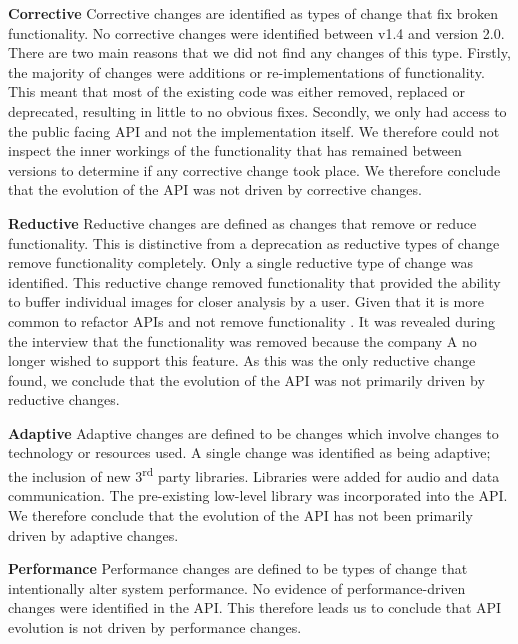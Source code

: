 \documentclass{sig-alternate}
\begin{document}
\smallskip \noindent
\textbf{Corrective  }
Corrective changes are identified as types of change that fix broken functionality.
No corrective changes were identified between v1.4 and version 2.0. There are two main reasons that we did not find any changes of this type. Firstly, the majority of changes were additions or re-implementations of functionality. This meant that most of the existing code was either removed, replaced or deprecated, resulting in little to no obvious fixes. Secondly, we only had access to the public facing API and not the implementation itself. We therefore could not inspect the inner workings of the functionality that has remained between versions to determine if any corrective change took place.
We therefore conclude that the evolution of the API was not driven by corrective changes.

\smallskip \noindent
\textbf{Reductive  }
Reductive changes are defined as changes that remove or reduce functionality. This is distinctive from a deprecation as reductive types of change remove functionality completely.
Only a single reductive type of change was identified. This reductive change removed functionality that provided the ability to buffer individual images for closer analysis by a user. Given that it is more common to refactor APIs and not remove functionality \cite{dig2005role, xing2006refactoring}. It was revealed during the interview that the functionality was removed because the company A no longer wished to support this feature. 
As this was the only reductive change found, we conclude that the evolution of the API was not primarily driven by reductive changes.

\smallskip \noindent
\textbf{Adaptive  }
Adaptive changes are defined to be changes which involve changes to technology or resources used. 
A single change was identified as being adaptive; the inclusion of new 3\textsuperscript{rd} party libraries. Libraries were added for audio and data communication. The pre-existing low-level library was incorporated into the API.
We therefore conclude that the evolution of the API has not been primarily driven by adaptive changes.

\smallskip \noindent
\textbf{Performance  }
Performance changes are defined to be types of change that intentionally alter system performance.
No evidence of performance-driven changes were identified in the API.
This therefore leads us to conclude that API evolution is not driven by performance changes.
\end{document}

